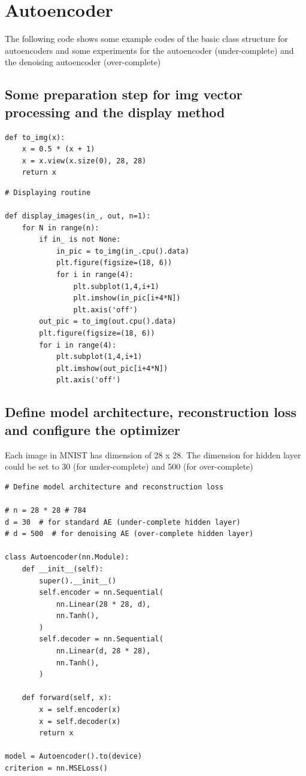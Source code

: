 \chapter{Autoencoder}
    
The following code shows some example codes of the basic class structure for autoencoders and some experiments for the autoencoder (under-complete) and the denoising autoencoder (over-complete)
\section{Some preparation step for img vector processing and the display method}
\begin{verbatim}
def to_img(x):
    x = 0.5 * (x + 1)
    x = x.view(x.size(0), 28, 28)
    return x       
\end{verbatim}
        
\begin{verbatim}
# Displaying routine

def display_images(in_, out, n=1):
    for N in range(n):
        if in_ is not None:
            in_pic = to_img(in_.cpu().data)
            plt.figure(figsize=(18, 6))
            for i in range(4):
                plt.subplot(1,4,i+1)
                plt.imshow(in_pic[i+4*N])
                plt.axis('off')
        out_pic = to_img(out.cpu().data)
        plt.figure(figsize=(18, 6))
        for i in range(4):
            plt.subplot(1,4,i+1)
            plt.imshow(out_pic[i+4*N])
            plt.axis('off')    
\end{verbatim}

\section{Define model architecture, reconstruction loss and configure the optimizer}

Each image in MNIST has dimension of 28 x 28. The dimension for hidden layer could be set to 30 (for under-complete) and 500 (for over-complete)

\begin{verbatim}
# Define model architecture and reconstruction loss

# n = 28 * 28 # 784
d = 30  # for standard AE (under-complete hidden layer)
# d = 500  # for denoising AE (over-complete hidden layer)

class Autoencoder(nn.Module):
    def __init__(self):
        super().__init__()
        self.encoder = nn.Sequential(
            nn.Linear(28 * 28, d),
            nn.Tanh(),
        )
        self.decoder = nn.Sequential(
            nn.Linear(d, 28 * 28),
            nn.Tanh(),
        )

    def forward(self, x):
        x = self.encoder(x)
        x = self.decoder(x)
        return x
    
model = Autoencoder().to(device)
criterion = nn.MSELoss()
\end{verbatim}

